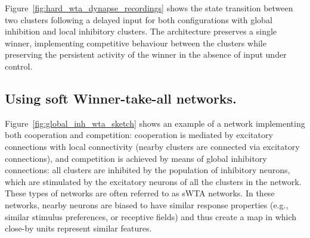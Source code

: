 

Figure~\ref{fig:hard_wta_dynapse_recordings} shows the state transition between two clusters following a delayed input for both configurations with global inhibition and local inhibitory clusters. The architecture preserves a single winner, implementing competitive behaviour between the clusters while preserving the persistent activity of the winner in the absence of input under control. 


\newpage
\subsection{Using soft Winner-take-all networks.}
\label{sec:sWTA}

Figure~\ref{fig:global_inh_wta_sketch} shows an example of a network implementing both cooperation and competition: cooperation is mediated by excitatory connections with local connectivity (nearby clusters are connected via excitatory connections), and competition is achieved by means of global inhibitory connections: all clusters are inhibited by the population of inhibitory neurons, which are stimulated by the excitatory neurons of all the clusters in the network.
These types of networks are often referred to as \ac{sWTA} networks.
In these networks, nearby neurons are biased to have similar response properties (e.g., similar stimulus preferences, or receptive fields) and thus create a map in which close-by units represent similar features.


